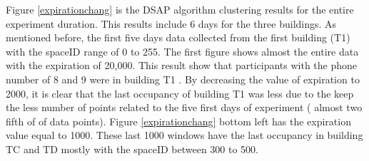 
Figure \ref{expirationchang} is the DSAP algorithm clustering results for the entire experiment duration. This results include 6 days for the three buildings. As mentioned before, the first five days data collected from the first building (T1) with the spaceID range of 0 to 255.
The first figure shows almost the entire data with the expiration of 20,000. This result show that participants with the phone number of 8 and 9 were in building T1 . By decreasing the value of expiration to 2000, it is clear that the last occupancy of building T1 was less due to the keep the less number of points related to the five first days of experiment ( almost two fifth of of data points). Figure \ref{expirationchang} bottom left has the expiration value equal to 1000. These last 1000 windows have the last occupancy in building TC and TD mostly with the spaceID between 300 to 500.


